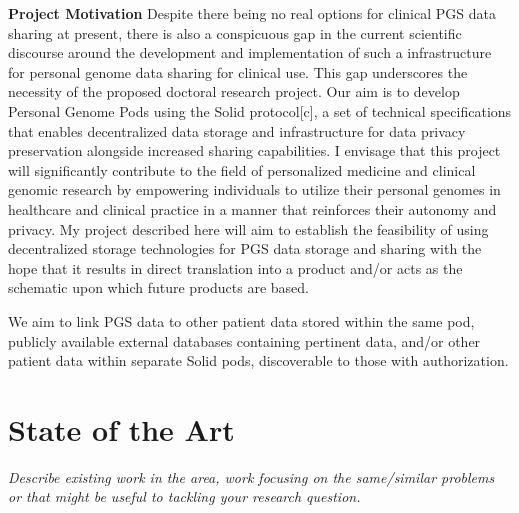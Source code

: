 \documentclass{article}
\begin{document}
\textbf{Project Motivation}
Despite there being no real options for clinical PGS data sharing at present, there is also a conspicuous gap in the current scientific discourse around the development and implementation of such a infrastructure for personal genome data sharing for clinical use. 
This gap underscores the necessity of the proposed doctoral research project.
Our aim is to develop Personal Genome Pods using the Solid protocol[c], a set of technical specifications that enables decentralized data storage and infrastructure for data privacy preservation alongside increased sharing capabilities.  
I envisage that this project will significantly contribute to the field of personalized medicine and clinical genomic research by empowering individuals to utilize their personal genomes in healthcare and clinical practice in a manner that reinforces their autonomy and privacy. 
My project described here will aim to establish the feasibility of using decentralized storage technologies for PGS data storage and sharing with the hope that it results in direct translation into a product and/or acts as the schematic upon which future products are based. 


We aim to link PGS data to other patient data stored within the same pod, publicly available external databases containing pertinent data, and/or other patient data within separate Solid pods, discoverable to those with authorization.


\section{State of the Art}
\textit{Describe existing work in the area, work focusing on the same/similar problems or that might be useful to tackling your research question.}
\end{document}
